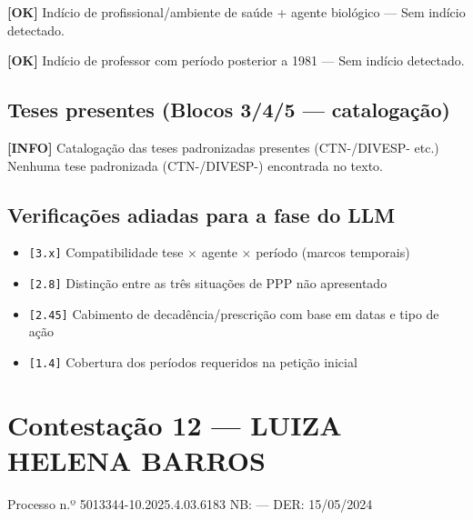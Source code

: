 \documentclass[12pt,a4paper]{article}
\newcommand{\statusOK}[1]{\textcolor{corOK}{\textbf{[OK]}} #1}
\newcommand{\statusINFO}[1]{\textcolor{corINFO}{\textbf{[INFO]}} #1}
\begin{document}
\medskip
\statusOK{Indício de profissional/ambiente de saúde + agente biológico} --- Sem indício detectado.

\medskip
\statusOK{Indício de professor com período posterior a 1981} --- Sem indício detectado.

\subsection{Teses presentes (Blocos 3/4/5 --- catalogação)}

\statusINFO{Catalogação das teses padronizadas presentes (CTN-/DIVESP- etc.)}\\
Nenhuma tese padronizada (CTN-/DIVESP-) encontrada no texto.

\subsection{Verificações adiadas para a fase do LLM}

\begin{itemize}
  \item \texttt{[3.x]} Compatibilidade tese × agente × período (marcos temporais)
  \item \texttt{[2.8]} Distinção entre as três situações de PPP não apresentado
  \item \texttt{[2.45]} Cabimento de decadência/prescrição com base em datas e tipo de ação
  \item \texttt{[1.4]} Cobertura dos períodos requeridos na petição inicial
\end{itemize}



\clearpage
{}
\section{Contestação 12 --- LUIZA HELENA BARROS}
\begin{center}
  {\small Processo n.º 5013344-10.2025.4.03.6183 \quad NB: — \quad DER: 15/05/2024}
\end{center}
\end{document}
